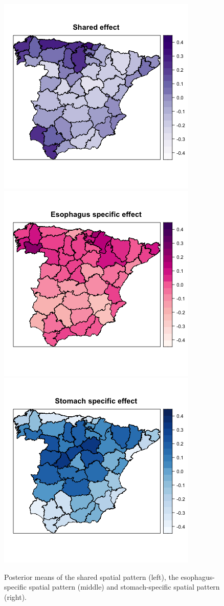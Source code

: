 \begin{figure}[h!]
\begin{center}
\includegraphics[scale=0.35]{images/Spain_Shared.png}
\includegraphics[scale=0.35]{images/Spain_Esophagus_specific.png}
\includegraphics[scale=0.35]{images/Spain_Stomach_specific.png}
\end{center}
\caption{Posterior means of the shared spatial pattern (left), the esophagus-specific spatial pattern (middle) and stomach-specific spatial pattern (right).}
\label{fig:spain}
\end{figure}
